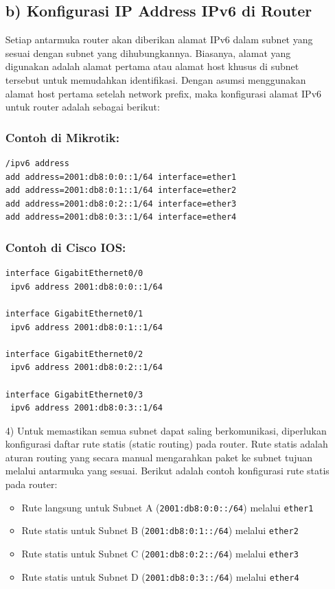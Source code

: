 \documentclass[12pt,a4paper]{article}
\begin{document}
\begin{itemize}
\subsection*{b) Konfigurasi IP Address IPv6 di Router}
Setiap antarmuka router akan diberikan alamat IPv6 dalam subnet yang sesuai dengan subnet yang dihubungkannya. Biasanya, alamat yang digunakan adalah alamat pertama atau alamat host khusus di subnet tersebut untuk memudahkan identifikasi. Dengan asumsi menggunakan alamat host pertama setelah network prefix, maka konfigurasi alamat IPv6 untuk router adalah sebagai berikut:
\subsubsection*{Contoh di Mikrotik:}
\begin{lstlisting}
/ipv6 address
add address=2001:db8:0:0::1/64 interface=ether1
add address=2001:db8:0:1::1/64 interface=ether2
add address=2001:db8:0:2::1/64 interface=ether3
add address=2001:db8:0:3::1/64 interface=ether4
\end{lstlisting}

\subsubsection*{Contoh di Cisco IOS:}
\begin{lstlisting}
interface GigabitEthernet0/0
 ipv6 address 2001:db8:0:0::1/64

interface GigabitEthernet0/1
 ipv6 address 2001:db8:0:1::1/64

interface GigabitEthernet0/2
 ipv6 address 2001:db8:0:2::1/64

interface GigabitEthernet0/3
 ipv6 address 2001:db8:0:3::1/64
\end{lstlisting}
\item[4)]Untuk memastikan semua subnet dapat saling berkomunikasi, diperlukan konfigurasi daftar rute statis (static routing) pada router. Rute statis adalah aturan routing yang secara manual mengarahkan paket ke subnet tujuan melalui antarmuka yang sesuai. Berikut adalah contoh konfigurasi rute statis pada router:

\begin{itemize}
    \item Rute langsung untuk Subnet A (\texttt{2001:db8:0:0::/64}) melalui \texttt{ether1}
    \item Rute statis untuk Subnet B (\texttt{2001:db8:0:1::/64}) melalui \texttt{ether2}
    \item Rute statis untuk Subnet C (\texttt{2001:db8:0:2::/64}) melalui \texttt{ether3}
    \item Rute statis untuk Subnet D (\texttt{2001:db8:0:3::/64}) melalui \texttt{ether4}
\end{itemize}


\end{itemize}
\end{document}
